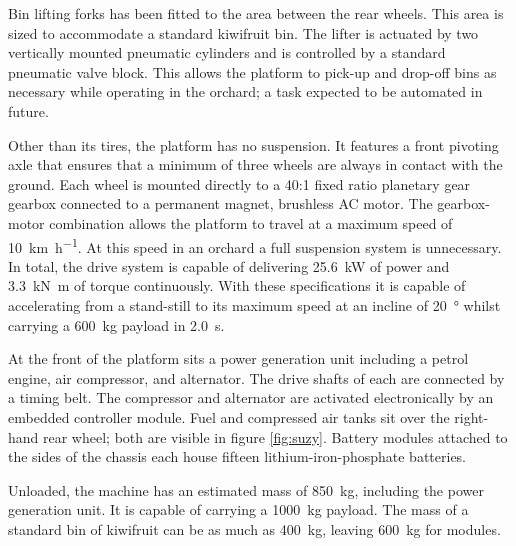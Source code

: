 \documentclass[preprint,authoryear,12pt]{elsarticle}
\begin{document}
        Bin lifting forks has been fitted to the area between the rear wheels.
        This area is sized to accommodate a standard kiwifruit bin.
        The lifter is actuated by two vertically mounted pneumatic cylinders and is controlled by a standard pneumatic valve block.
        This allows the platform to pick-up and drop-off bins as necessary while operating in the orchard; a task expected to be automated in future.

        Other than its tires, the platform has no suspension.
        It features a front pivoting axle that ensures that a minimum of three wheels are always in contact with the ground.
        Each wheel is mounted directly to a 40:1 fixed ratio planetary gear gearbox connected to a permanent magnet, brushless AC motor.
        The gearbox-motor combination allows the platform to travel at a maximum speed of \SI{10}{\kilo\meter\per\hour}.
        At this speed in an orchard a full suspension system is unnecessary.
        In total, the drive system is capable of delivering \SI{25.6}{\kilo\watt} of power and \SI{3.3}{\kilo\newton\meter} of torque continuously.
        With these specifications it is capable of accelerating from a stand-still to its maximum speed at an incline of \SI{20}{\degree} whilst carrying a \SI{600}{\kilo\gram} payload in \SI{2.0}{\second}.

        At the front of the platform sits a power generation unit including a petrol engine, air compressor, and alternator.
        The drive shafts of each are connected by a timing belt.
        The compressor and alternator are activated electronically by an embedded controller module.
        Fuel and compressed air tanks sit over the right-hand rear wheel; both are visible in figure \ref{fig:suzy}.
        Battery modules attached to the sides of the chassis each house fifteen lithium-iron-phosphate batteries.

        Unloaded, the machine has an estimated mass of \SI{850}{\kilo\gram}, including the power generation unit.
        It is capable of carrying a \SI{1000}{\kilo\gram} payload.
        The mass of a standard bin of kiwifruit can be as much as \SI{400}{\kilo\gram}, leaving \SI{600}{\kilo\gram} for modules.
\end{document}
